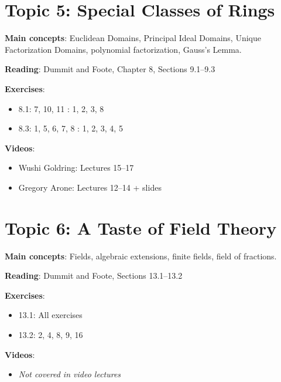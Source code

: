 \documentclass[12pt]{article}
\begin{document}
\section{Topic 5: Special Classes of Rings}
\textbf{Main concepts}: Euclidean Domains, Principal Ideal Domains, Unique Factorization Domains, polynomial factorization, Gauss’s Lemma.

\textbf{Reading}: Dummit and Foote, Chapter 8, Sections 9.1–9.3

\textbf{Exercises}:
\begin{itemize}
    \item 8.1: 7, 10, 11 : 1, 2, 3, 8
    \item 8.3: 1, 5, 6, 7, 8 : 1, 2, 3, 4, 5
\end{itemize}

\textbf{Videos}:
\begin{itemize}
    \item Wushi Goldring: Lectures 15–17
    \item Gregory Arone: Lectures 12–14 + slides
\end{itemize}

\section{Topic 6: A Taste of Field Theory}
\textbf{Main concepts}: Fields, algebraic extensions, finite fields, field of fractions.

\textbf{Reading}: Dummit and Foote, Sections 13.1–13.2

\textbf{Exercises}:
\begin{itemize}
    \item 13.1: All exercises
    \item 13.2: 2, 4, 8, 9, 16
\end{itemize}

\textbf{Videos}:
\begin{itemize}
    \item \emph{Not covered in video lectures}
\end{itemize}
\end{document}
